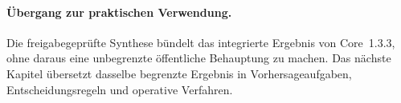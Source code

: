 \begingroup
\small

\endgroup

\paragraph{Übergang zur praktischen Verwendung.}
Die freigabegeprüfte Synthese bündelt das integrierte Ergebnis von Core~1.3.3,
ohne daraus eine unbegrenzte öffentliche Behauptung zu machen. Das nächste
Kapitel übersetzt dasselbe begrenzte Ergebnis in Vorhersageaufgaben,
Entscheidungsregeln und operative Verfahren.

